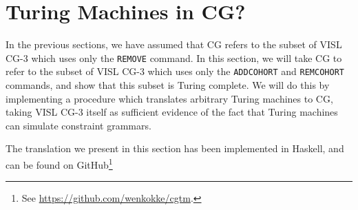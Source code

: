 \documentclass[11pt]{article}
\def\t#1{\texttt{#1}}
\begin{document}
\section{Turing Machines in CG?}\label{sec:turingcomplete}
In the previous sections, we have assumed that CG refers to the subset of VISL
CG-3 which uses only the \t{REMOVE} command. In this section, we will take CG to
refer to the subset of VISL CG-3 which uses only the \t{ADDCOHORT} and
\t{REMCOHORT} commands, and show that this subset is Turing complete.
We will do this by implementing a procedure which translates arbitrary Turing
machines to CG, taking VISL CG-3 itself as sufficient evidence of the fact that
Turing machines can simulate constraint grammars.

The translation we present in this section has been implemented in Haskell, and
can be found on GitHub\footnote{%
  See \url{https://github.com/wenkokke/cgtm}.
}
\end{document}
